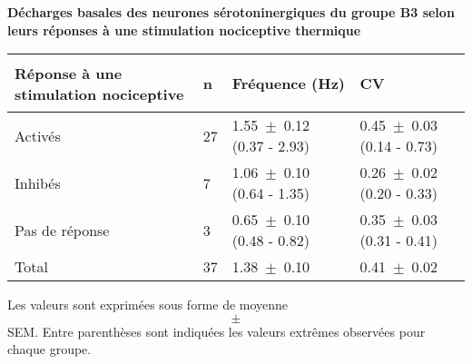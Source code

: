 % 
% 
% 
% 
% 
% 
% 
% 
% 
% 
% 
% 
\centering
{%
\newcommand{\mc}[3]{\multicolumn{#1}{#2}{#3}}



\begin{center}
\caption{\textbf{Décharges basales des neurones sérotoninergiques du groupe B3 selon leurs réponses à une stimulation nociceptive thermique}}

\bigskip 

\begin{tabular}{|A|B|m{4.5cm}|m{4.5cm}|}
\hline
Réponse à une stimulation nociceptive	& \textbf{n}	& \begin{center}\textbf{Fréquence (Hz)}\end{center}	& \begin{center}\textbf{CV} \end{center} \\ \hline
Activés 				& 27 		& 1.55 $\pm$ 0.12 (0.37 - 2.93) 				& 0.45 $\pm$ 0.03 (0.14 - 0.73)		 \\ \hline
Inhibés					& 7 		& 1.06 $\pm$ 0.10 (0.64 - 1.35) 				& 0.26 $\pm$ 0.02 (0.20 - 0.33)		 \\ \hline
Pas de réponse 				& 3 		& 0.65 $\pm$ 0.10 (0.48 - 0.82) 				& 0.35 $\pm$ 0.03 (0.31 - 0.41)		 \\ \hline
Total 					& 37 		& 1.38 $\pm$ 0.10 						& 0.41 $\pm$ 0.02				 \\ \hline
\end{tabular}
\end{center}

{\protect\parbox[t]{18cm}{
\small Les valeurs sont exprimées sous forme de moyenne $$\pm$$ SEM. Entre parenthèses sont indiquées les valeurs extrêmes observées pour chaque groupe.
}}

}
% 
